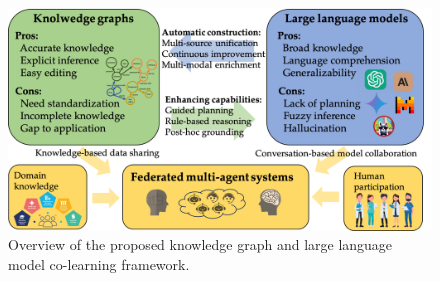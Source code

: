 \begin{figure}[t]
\centering
\includegraphics[width=30pc]{submissions/CarlYang2024/figures/intro.png}
\vspace{-3mm}
\caption{Overview of the proposed {knowledge graph and large language model co-learning framework}.}
\vspace{-5mm}
\label{fig:intro}
\end{figure}

